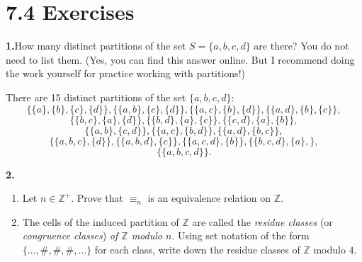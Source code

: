 \documentclass[10pt,]{book}
\theoremstyle{plain}
\theoremstyle{definition}
\theoremstyle{definition}
\theoremstyle{definition}
\theoremstyle{definition}
\numberwithin{equation}{section}
\def\Z{\mathbb{Z}}
\begin{document}
\section*{7.4 Exercises}
\noindent\textbf{1.}\quad{}How many distinct partitions of the set \(S=\{a,b,c,d\}\) are there? You do not need to list them. (Yes, you can find this answer online. But I recommend doing the work yourself for practice working with partitions!)%
\par\smallskip
There are 15 distinct partitions of the set \(\{a,b,c,d\}\):%
\begin{equation*}
\{\{a\},\{b\},\{c\},\{d\}\}, \{\{a,b\},\{c\},\{d\}\},\{\{a,c\},\{b\},\{d\}\},\{\{a,d\},\{b\},\{c\}\},
\end{equation*}
%
\begin{equation*}
\{\{b,c\},\{a\},\{d\}\},\{\{b,d\},\{a\},\{c\}\},\{\{c,d\},\{a\},\{b\}\},
\end{equation*}
%
\begin{equation*}
\{\{a,b\},\{c,d\}\},
\{\{a,c\},\{b,d\}\},\{\{a,d\},\{b,c\}\},
\end{equation*}
%
\begin{equation*}
\{\{a,b,c\},\{d\}\},\{\{a,b,d\},\{c\}\},\{\{a,c,d\},\{b\}\},\{\{b,c,d\},\{a\},\},
\end{equation*}
%
%
\begin{equation*}
\{\{a,b,c,d\}\}.
\end{equation*}
\par\smallskip
\noindent\textbf{2.}\quad{}\leavevmode%
\begin{enumerate}[label=(\alph*)]
\item\hypertarget{li-408}{}Let  \(n\in \Z^+\). Prove that  \(\equiv_n\) is an equivalence relation on \(\Z\).%
\item\hypertarget{li-409}{}The cells of the induced partition of \(\Z\) are called the \emph{residue classes} (or \emph{congruence classes}) \emph{of \(\Z\) modulo \(n\)}.  Using set notation of the form \(\{\ldots,\#, \#,\#,\ldots\}\) for each class, write down the residue classes of \(\Z\) modulo \(4\).%
\end{enumerate}
\par\smallskip
\leavevmode%
\end{document}
